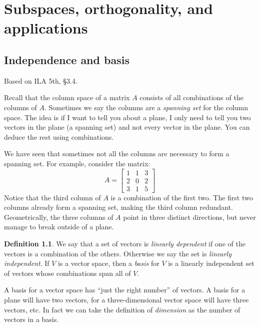 \documentclass[11pt,oneside]{amsbook}
\theoremstyle{definition}
\theoremstyle{plain}
\theoremstyle{definition}
\newtheorem{definition}[theorem]{Definition}
\theoremstyle{remark}
\numberwithin{equation}{section}
\numberwithin{figure}{section}
\begin{document}
\chapter{Subspaces, orthogonality, and applications}

\section{Independence and basis}

Based on ILA 5th, \S 3.4.

Recall that the column space of a matrix $A$ consists of all combinations of the columns of $A$. Sometimes we say the columns are a \emph{spanning set} for the column space. The idea is if I want to tell you about a plane, I only need to tell you two vectors in the plane (a spanning set) and not every vector in the plane. You can deduce the rest using combinations.

We have seen that sometimes not all the columns are necessary to form a spanning set. For example, consider the matrix:
\[A=\begin{bmatrix}1&1&3\\2&0&2\\3&1&5\end{bmatrix}
\]
Notice that the third column of $A$ is a combination of the first two. The first two columns already form a spanning set, making the third column redundant. Geometrically, the three columns of $A$ point in three distinct directions, but never manage to break outside of a plane.

\begin{definition}
  We say that a set of vectors is \emph{linearly dependent} if one of the vectors is a combination of the others. Otherwise we say the set is \emph{linearly independent}. If $V$ is a vector space, then a \emph{basis} for $V$ is a linearly independent set of vectors whose combinations span all of $V$.
\end{definition}

A basis for a vector space has ``just the right number'' of vectors. A basis for a plane will have two vectors, for a three-dimensional vector space will have three vectors, etc. In fact we can take the definition of \emph{dimension} as the number of vectors in a basis.
\end{document}
